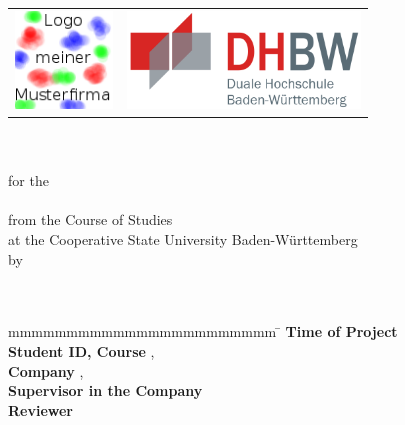 \begin{titlepage}
	\begin{longtable}{p{} p{}}
	  {\includegraphics[height=2.6cm]{images/logo.png}} & 
	  {\includegraphics[height=2.6cm]{images/dhbw.png}}
	\end{longtable}
	\enlargethispage{20mm}
	\begin{center}
	  \vspace*{12mm}	{\LARGE\textbf \titel }\\
	  \vspace*{12mm}	{\large\textbf \arbeit}\\
	  \vspace*{12mm}	for the\\
	  \vspace*{3mm} 	{\textbf \abschluss}\\
	  \vspace*{12mm}	from the Course of Studies \studiengang\\
	  \vspace*{3mm} 	at the Cooperative State University Baden-Württemberg \dhbw\\
	  \vspace*{12mm}	by\\
	  \vspace*{3mm} 	{\large\textbf \autor}\\
	  \vspace*{12mm}	\datumAbgabe\\
	\end{center}
	\vfill
	\begin{spacing}{1.2}
	\begin{tabbing}
		mmmmmmmmmmmmmmmmmmmmmmm     \= \kill
		\textbf{Time of Project}  \>  \zeitraum\\
		\textbf{Student ID, Course}  \>  \matrikelnr, \kurs\\
		\textbf{Company}      \>  \firma, \firmenort\\
		\textbf{Supervisor in the Company}              \>  \betreuer\\
		\textbf{Reviewer}             \>  \gutachter
	\end{tabbing}
	\end{spacing}
\end{titlepage}
